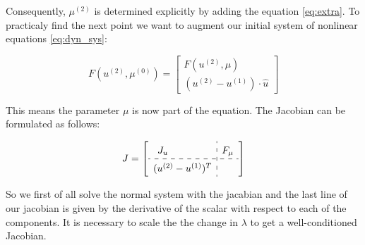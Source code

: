 Consequently, $\mu^{(2)}$ is determined explicitly by adding the equation
\eqref{eq:extra}. To practicaly find the next point we want to augment our
initial system of nonlinear equations \eqref{eq:dyn_sys}:

\begin{equation}
  F(u^{(2)}, \mu^{(0)}) = 
\begin{bmatrix} F(u^{(2)}, \mu) \\ (u^{(2)} - u^{(1)})  \cdot \hat{u}
\end{bmatrix} \label{eq:dyn_sys_cont}
\end{equation}

This means the parameter $\mu$ is now part of the equation. The Jacobian can be
formulated as follows: 

\begin{center}
\[
\renewcommand\arraystretch{1.5}
J = 
\left[
\begin{array}{c:c}
  J_u \quad \quad \quad \quad & F_{\mu} \\
  \hdashline
  (u^{(2)} - u^{(1)})^T
\end{array} \label{eq:jac_aug}
\right]
\]
\end{center}

So we first of all solve the normal system with the jacabian and the last line
of our jacobian is given by the derivative of the scalar with respect to each
of the components. It is necessary to   scale the the change in $\lambda$ to
get a well-conditioned Jacobian.

\begin{figure}[ht]
\centering

\begin{subfigure}[t]{0.3\textwidth}
\centering
{}

 \label{fig:saddlenode}
  \end{subfigure}
\end{figure}

